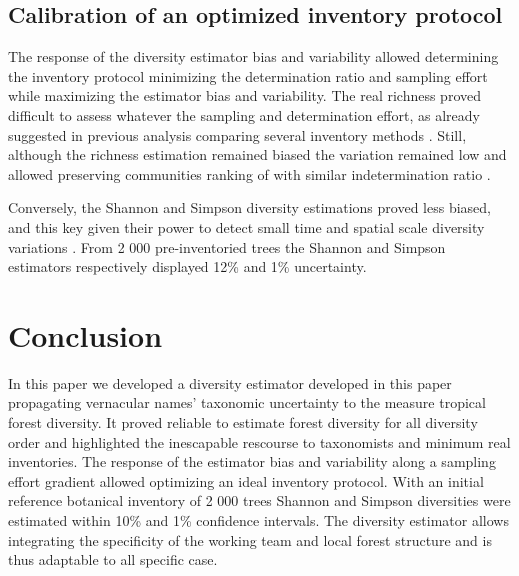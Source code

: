 \documentclass[fleqn,10pt]{ArtEcoFoG} %
\begin{document}
\subsection{Calibration of an optimized inventory
protocol}\label{calibration-of-an-optimized-inventory-protocol}

The response of the diversity estimator bias and variability allowed
determining the inventory protocol minimizing the determination ratio
and sampling effort while maximizing the estimator bias and variability.
The real richness proved difficult to assess whatever the sampling and
determination effort, as already suggested in previous analysis
comparing several inventory methods \citep{Higgins2004}. Still, although
the richness estimation remained biased the variation remained low and
allowed preserving communities ranking of with similar indetermination
ratio \citep{Vellend2008}.

Conversely, the Shannon and Simpson diversity estimations proved less
biased, and this key given their power to detect small time and spatial
scale diversity variations
\citep{Baraloto2012a, Berry2008a, Cannon1998, Plumptre1996}. From 2 000
pre-inventoried trees the Shannon and Simpson estimators respectively
displayed 12\% and 1\% uncertainty.

\section{Conclusion}\label{conclusion}

In this paper we developed a diversity estimator developed in this paper
propagating vernacular names' taxonomic uncertainty to the measure
tropical forest diversity. It proved reliable to estimate forest
diversity for all diversity order and highlighted the inescapable
rescourse to taxonomists and minimum real inventories. The response of
the estimator bias and variability along a sampling effort gradient
allowed optimizing an ideal inventory protocol. With an initial
reference botanical inventory of 2 000 trees Shannon and Simpson
diversities were estimated within 10\% and 1\% confidence intervals. The
diversity estimator allows integrating the specificity of the working
team and local forest structure and is thus adaptable to all specific
case.



\makeatletter

\makeatother


\end{document}
